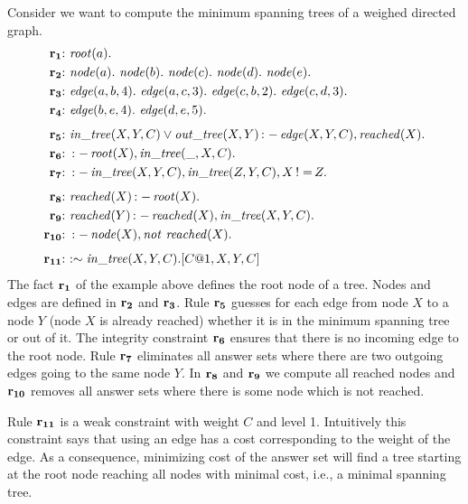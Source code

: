 \documentclass[a4paper, titlepage]{article}
\DeclareMathOperator{\leftimpl}{:-}
\DeclareMathOperator{\nott}{\mathit{not}}
\DeclareMathOperator{\noteq}{!=}
\newcommand{\row}[1]{%
  \ensuremath{\color{black}\ensuremath{\mathbf{#1}} \color{black}}%
}
\newcommand{\rowprefix}[1]{%
  \ensuremath{\color{black}\mathbf{#1{:}}\ }%
}
\begin{document}
\begin{exmp}
Consider we want to compute the minimum spanning trees 
of a weighed directed graph.
\begin{align*}
\rowprefix{r_1}& \mathit{root}(a). \\
\rowprefix{r_2}& \mathit{node}(a). \ \mathit{node}(b). \ 
  \mathit{node}(c). \ \mathit{node}(d). \ \mathit{node}(e). \ \\
\rowprefix{r_3}& \mathit{edge}(a,b,4). \ \mathit{edge}(a,c,3). \ 
  \mathit{edge}(c,b,2). \ \mathit{edge}(c,d,3). \ \\
\rowprefix{r_4}& \mathit{edge}(b,e,4). \ \mathit{edge}(d,e,5). \ \\[1ex]
\rowprefix{r_5} & \mathit{in\_tree}(X,Y,C) \vee 
  \mathit{out\_tree}(X,Y) \leftimpl \mathit{edge}(X,Y,C), 
  \mathit{reached}(X). \\
\rowprefix{r_6}& \leftimpl \mathit{root}(X), \mathit{in\_tree} (\_,X,C).\\
\rowprefix{r_7}& \leftimpl \mathit{in\_tree}(X,Y,C), 
  \mathit{in\_tree}(Z,Y,C), X \noteq Z. \\[1ex]
\rowprefix{r_8}& \mathit{reached}(X) \leftimpl \mathit{root} (X). \\
\rowprefix{r_9}& \mathit{reached}(Y) \leftimpl 
  \mathit{reached}(X), \mathit{in\_tree}(X,Y,C). \\
\rowprefix{r_{10}}& \leftimpl \mathit{node}(X), \nott \thinspace 
  \mathit{reached}(X). \\[1ex]
\rowprefix{r_{11}}&\mathit{ : \sim in\_tree}(X,Y,C). [C@1,X,Y,C]
\end{align*}
The fact $\row{r_1}$ of the example above defines the root node 
of a tree. Nodes and edges are defined in $\row{r_2}$ and $\row{r_3}$. 
Rule $\row{r_5}$ guesses for each edge from node 
$X$ to a node $Y$ (node $X$ is already reached) whether it is in the minimum spanning 
tree or out of it. The integrity constraint $\row{r_6}$ ensures 
that there is no incoming edge to the root node. Rule $\row{r_7}$ 
eliminates all answer sets where there are two outgoing 
edges going to the same node $Y$. In $\row{r_8}$ and $\row{r_9}$ 
we compute all reached nodes and $\row{r_{10}}$ removes all answer sets where there is some node 
which is not reached.

Rule $\row{r_{11}}$ is a weak 
constraint with weight $C$ and level 1.
Intuitively this constraint says that using an edge
has a cost corresponding to the weight of the edge.
As a consequence, minimizing cost of the answer set
will find a tree starting at the root node
reaching all nodes with minimal cost,
i.e., a minimal spanning tree.


\end{exmp}
\end{document}
